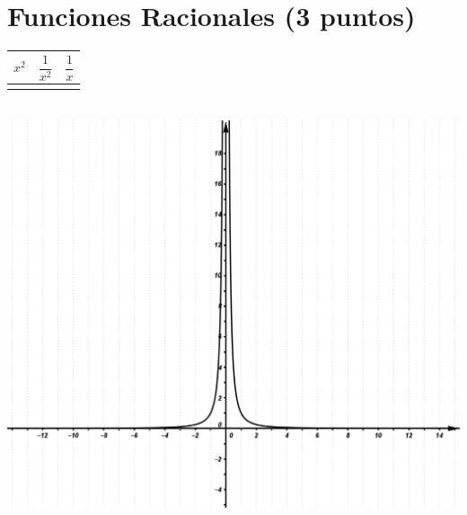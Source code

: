 \documentclass[a4paper,11pt,spanish,sans]{exam}
\newcommand{\Ts}{\rule{0pt}{2.8ex}}       %
\newcommand{\Bs}{\rule[-1.5ex]{0pt}{0pt}} %
\begin{document}
	\section{Funciones Racionales (3 puntos)}
	\begin{minipage}{0.5\textwidth}
		\centering
		\label{mc3}
		\begin{tabular}{|c|c|c|}
			\hline
			$x^2$  & $\dfrac{1}{x^2}$ & $\dfrac{1}{x}$ \Ts \Bs   \\ \hline
			&   &      \\ \hline
		\end{tabular}\\
		\centering
		\includegraphics[width= 0.95\linewidth]{didacvulcano.png}
	\end{minipage}
\end{document}
